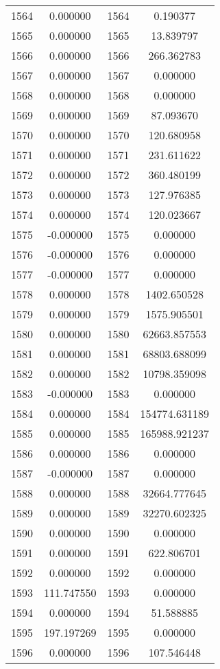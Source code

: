 \documentclass[12pt]{article}
\begin{document}
\begin{longtable}{@{}cccc@{}}
1564 & 0.000000 & 1564 & 0.190377 \\
1565 & 0.000000 & 1565 & 13.839797 \\
1566 & 0.000000 & 1566 & 266.362783 \\
1567 & 0.000000 & 1567 & 0.000000 \\
1568 & 0.000000 & 1568 & 0.000000 \\
1569 & 0.000000 & 1569 & 87.093670 \\
1570 & 0.000000 & 1570 & 120.680958 \\
1571 & 0.000000 & 1571 & 231.611622 \\
1572 & 0.000000 & 1572 & 360.480199 \\
1573 & 0.000000 & 1573 & 127.976385 \\
1574 & 0.000000 & 1574 & 120.023667 \\
1575 & -0.000000 & 1575 & 0.000000 \\
1576 & -0.000000 & 1576 & 0.000000 \\
1577 & -0.000000 & 1577 & 0.000000 \\
1578 & 0.000000 & 1578 & 1402.650528 \\
1579 & 0.000000 & 1579 & 1575.905501 \\
1580 & 0.000000 & 1580 & 62663.857553 \\
1581 & 0.000000 & 1581 & 68803.688099 \\
1582 & 0.000000 & 1582 & 10798.359098 \\
1583 & -0.000000 & 1583 & 0.000000 \\
1584 & 0.000000 & 1584 & 154774.631189 \\
1585 & 0.000000 & 1585 & 165988.921237 \\
1586 & 0.000000 & 1586 & 0.000000 \\
1587 & -0.000000 & 1587 & 0.000000 \\
1588 & 0.000000 & 1588 & 32664.777645 \\
1589 & 0.000000 & 1589 & 32270.602325 \\
1590 & 0.000000 & 1590 & 0.000000 \\
1591 & 0.000000 & 1591 & 622.806701 \\
1592 & 0.000000 & 1592 & 0.000000 \\
1593 & 111.747550 & 1593 & 0.000000 \\
1594 & 0.000000 & 1594 & 51.588885 \\
1595 & 197.197269 & 1595 & 0.000000 \\
1596 & 0.000000 & 1596 & 107.546448 \\

\end{longtable}
\end{document}
